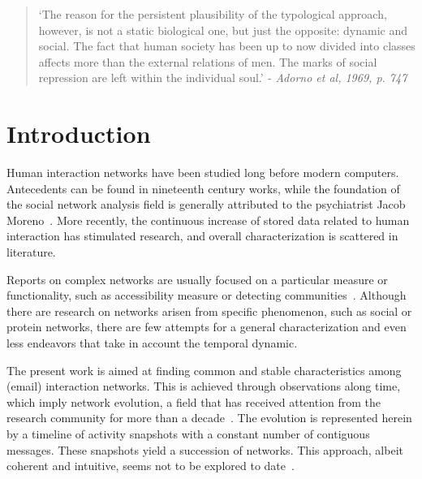 \documentclass[%
 aip,
 jmp,%
 amsmath,amssymb,
 reprint,%
]{revtex4-1}
\begin{document}
\begin{quotation}
`The reason for the persistent plausibility of the typological approach, however, is not a static biological one, but just the opposite: dynamic and social. The fact that human society has been up to now divided into classes affects more than the external relations of men. The marks of social repression are left within the individual soul.' 
\emph{- Adorno et al, 1969, p. 747}
\end{quotation}


\section{Introduction}\label{sec:into}
Human interaction networks have been studied long before modern computers.
Antecedents can be found in nineteenth century works, while the foundation of
the social network analysis field is generally attributed to the psychiatrist Jacob Moreno~\cite{newmanBook}.
More recently, the continuous increase of stored data related to human interaction has stimulated research,
and overall characterization is scattered in literature.

Reports on complex networks are usually focused on a particular measure or functionality, such
as accessibility measure or detecting communities~\cite{access,newmanModularity}. Although there are research on networks arisen from specific phenomenon, such as social or protein networks, there are few attempts for a general characterization and even less endeavors that take in account the temporal dynamic.

The present work is aimed at finding common and stable characteristics among (email) interaction networks. This is achieved through observations along time, which imply network evolution, a field that has received attention from the research community
for more than a decade~\cite{barabasiEvo,newmanEvolving}. The evolution is represented herein by a timeline of activity snapshots with a constant number of contiguous messages. These snapshots yield a succession of networks. This approach, albeit coherent and intuitive, seems not to be explored to date~\cite{netWindowEvo}.
\end{document}
